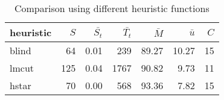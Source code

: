 \begin{table}[htbp]
\centering
\begin{tabular}{lrrrrrr}
  \hline
heuristic & $S$ & $\bar{S_t}$ & $\bar{T_t}$ & $\bar{M}$ & $\bar{u}$ & $C$ \\ 
  \hline
blind &  64 & 0.01 & 239 & 89.27 & 10.27 &  15 \\ 
  lmcut & 125 & 0.04 & 1767 & 90.82 & 9.73 &  11 \\ 
  hstar &  70 & 0.00 & 568 & 93.36 & 7.82 &  15 \\ 
   \hline
\end{tabular}
\caption{Comparison using different heuristic functions} 
\label{tab:summary_heuristics}
\end{table}
